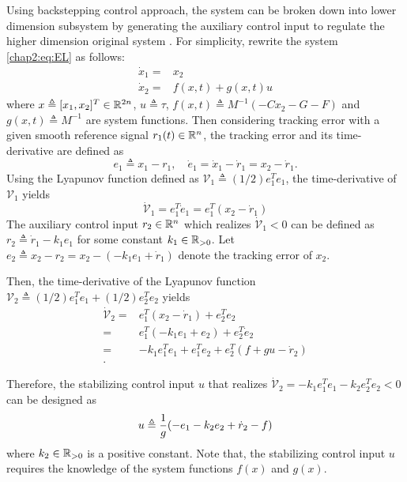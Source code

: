 Using backstepping control approach, the system can be broken down into lower dimension subsystem by generating the auxiliary control input to regulate the higher dimension original system \cite{RN7}.
For simplicity, rewrite the system \eqref{chap2:eq:EL} as follows:
\begin{equation}
  \begin{aligned}
    \dot x_1 =& x_2\\
    \dot x_2 =& f(x,t)+g(x,t)u
  \end{aligned}
\end{equation}
where $x\triangleq [x_1,x_2]^T\in\mathbb{R}^{2n}$, $u\triangleq \tau$, $f(x,t)\triangleq M^{-1}(-Cx_2-G-F)$ and $g(x,t)\triangleq M^{-1}$ are system functions.
Then considering tracking error with a given smooth reference signal $r_1(t)\in\mathbb{R}^n$, the tracking error and its time-derivative are defined as
\begin{equation}
  e_1\triangleq x_1-r_1,\quad \dot e_1= \dot x_1-\dot r_1=x_2-\dot r_1
  .
\end{equation}
Using the Lyapunov function defined as $\mathcal V_1\triangleq (1/2)e_1^Te_1$, the time-derivative of $\mathcal V_1$ yields
\begin{equation}
  \dot {\mathcal V}_1 =e_1^T\dot e_1=e_1^T(x_2-\dot r_1)
\end{equation}
The auxiliary control input $r_2\in\mathbb{R}^n$ which realizes $\dot{\mathcal V}_1<0$ can be defined as $r_2\triangleq \dot r_1 -k_1e_1$ for some constant $k_1\in\mathbb{R}_{>0}$.
Let $e_2\triangleq x_2-r_2=x_2-(-k_1e_1+\dot r_1)$ denote the tracking error of $x_2$.

Then, the time-derivative of the Lyapunov function $\mathcal V_2\triangleq (1/2)e_1^Te_1+(1/2)e_2^Te_2$ yields
\begin{equation}
  \begin{aligned}
    \dot {\mathcal V}_2
    =&
    e_1^T(x_2-\dot r_1)+e_2^Te_2\\
    =&
    e_1^T(-k_1e_1+e_2)+e_2^T\dot e_2\\
    =&
    -k_1e_1^Te_1+e_1^Te_2+e_2^T(f+gu-\dot r_2)\\
    .
  \end{aligned}
\end{equation}

Therefore, the stabilizing control input $u$ that realizes $\dot {\mathcal V}_2=-k_1e_1^Te_1-k_2e_2^Te_2<0$ can be designed as
\begin{equation}
  u\triangleq {1\over g} (-e_1 -k_2e_2 +\dot r_2 -f)
\end{equation}
where $k_2\in\mathbb{R}_{>0}$ is a positive constant.
Note that, the stabilizing control input $u$ requires the knowledge of the system functions $f(x)$ and $g(x)$.
 
